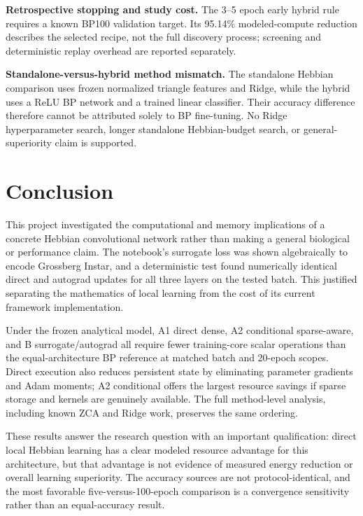 \documentclass{article}
\begin{document}
\begin{enumerate}[noitemsep]
    {\color{red}\item \textbf{Retrospective stopping and study cost.} The 3--5 epoch early hybrid rule requires a known BP100 validation target. Its 95.14\% modeled-compute reduction describes the selected recipe, not the full discovery process; screening and deterministic replay overhead are reported separately.}
    {\color{red}\item \textbf{Standalone-versus-hybrid method mismatch.} The standalone Hebbian comparison uses frozen normalized triangle features and Ridge, while the hybrid uses a ReLU BP network and a trained linear classifier. Their accuracy difference therefore cannot be attributed solely to BP fine-tuning. No Ridge hyperparameter search, longer standalone Hebbian-budget search, or general-superiority claim is supported.}
    \end{enumerate}
    
    \section{Conclusion}
    
    This project investigated the computational and memory implications of a concrete Hebbian convolutional network rather than making a general biological or performance claim. The notebook's surrogate loss was shown algebraically to encode Grossberg Instar, and a deterministic test found numerically identical direct and autograd updates for all three layers on the tested batch. This justified separating the mathematics of local learning from the cost of its current framework implementation.
    
    Under the frozen analytical model, A1 direct dense, A2 conditional sparse-aware, and B surrogate/autograd all require fewer training-core scalar operations than the equal-architecture BP reference at matched batch and 20-epoch scopes. Direct execution also reduces persistent state by eliminating parameter gradients and Adam moments; A2 conditional offers the largest resource savings if sparse storage and kernels are genuinely available. The full method-level analysis, including known ZCA and Ridge work, preserves the same ordering.
    
    These results answer the research question with an important qualification: direct local Hebbian learning has a clear modeled resource advantage for this architecture, but that advantage is not evidence of measured energy reduction or overall learning superiority. The accuracy sources are not protocol-identical, and the most favorable five-versus-100-epoch comparison is a convergence sensitivity rather than an equal-accuracy result.
\end{document}
